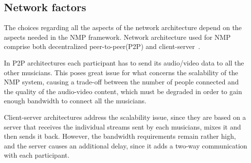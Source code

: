 
\subsection{Network factors}\label{subsec:network}
The choices regarding all the aspects of the network architecture depend on the aspects needed in the NMP framework. 
Network architecture used for NMP comprise both decentralized peer-to-peer(P2P) and client-server~\cite{RottondiOverview}. 

In P2P architectures each participant has to send its audio/video data to all the other musicians. This poses great issue for what concerns the scalability of the NMP system, causing a trade-off between the number of people connected and the quality of the audio-video content, which must be degraded in order to gain enough bandwidth to connect all the musicians.

Client-server architectures address the scalability issue, since they are based on a server that receives the individual streams sent by each musicians, mixes it and then sends it back. However, the bandwidth requirements remain rather high, and the server causes an additional delay, since it adds a two-way communication with each participant.


